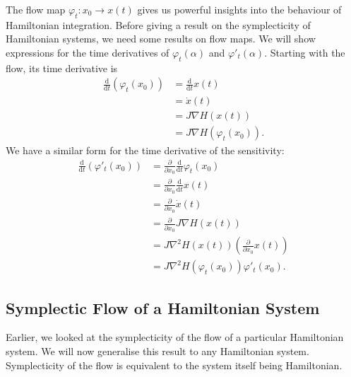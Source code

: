 The flow map $\varphi_t: {x}_0 \rightarrow {x}(t)$ gives us powerful insights into the behaviour of Hamiltonian integration.
Before giving a result on the symplecticity of Hamiltonian systems, we need some results on flow maps.
We will show expressions for the time derivatives of $\varphi_t(\alpha)$ and $\varphi'_t(\alpha)$.
Starting with the flow, its time derivative is
\begin{align*}
	\frac{\mathrm{d}}{\mathrm{d}t} \left( \varphi_t({x}_0) \right) &= \frac{\mathrm{d}}{\mathrm{d}t} {x}(t) \\
	&= \dot{{x}}(t) \\
	&= {J}\nabla H({x}(t)) \\
	&= {J}\nabla H \left( \varphi_t({x}_0) \right).
\end{align*}
We have a similar form for the time derivative of the sensitivity:
\begin{align*}
	\frac{\mathrm{d}}{\mathrm{d}t} \left( \varphi'_t({x}_0) \right) &= \frac{\partial}{\partial {x}_0} \frac{\mathrm{d}}{\mathrm{d}t} \varphi_t({x}_0) \\
	&= \frac{\partial}{\partial {x}_0} \frac{\mathrm{d}}{\mathrm{d}t} {x}(t) \\
	&= \frac{\partial}{\partial {x}_0} \dot{{x}}(t) \\
	&= \frac{\partial}{\partial {x}_0} {J}\nabla H({x}(t)) \\
	&= J \nabla^2 H({x}(t)) \left(\frac{\partial}{\partial {x}_0} {x}(t)\right) \\
	&= J \nabla^2 H(\varphi_t({x}_0))\varphi'_t({x}_0).
\end{align*}

\subsection{Symplectic Flow of a Hamiltonian System}

Earlier, we looked at the symplecticity of the flow of a particular Hamiltonian system.
We will now generalise this result to any Hamiltonian system.
Symplecticity of the flow is equivalent to the system itself being Hamiltonian.

